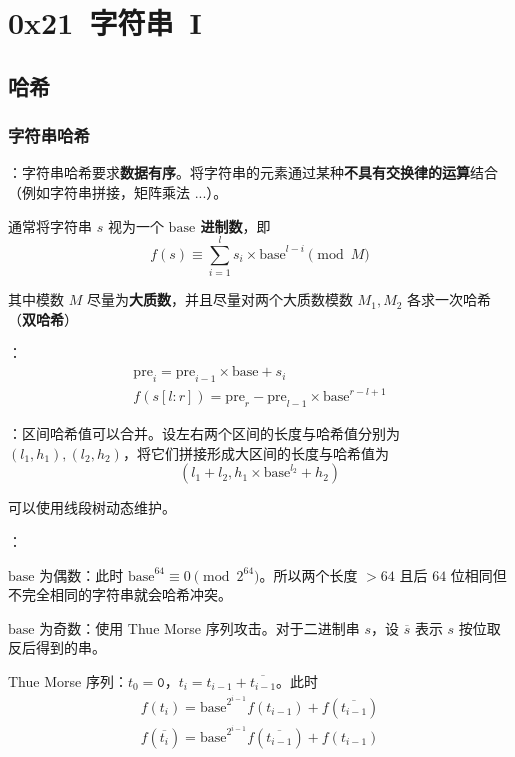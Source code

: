 \section{0x21\ 字符串\ I}
\label{sec:0x21}

\subsection{哈希}

\subsubsection{字符串哈希}

：字符串哈希要求\textbf{数据有序}。将字符串的元素通过某种\textbf{不具有交换律的运算}结合（例如字符串拼接，矩阵乘法 ...）。

通常将字符串 $s$ 视为一个 \textbf{$\mathrm{base}$ 进制数}，即
\[
f(s) \equiv \sum_{i = 1}^{l} s_i \times \mathrm{base}^{l - i} \pmod M
\]

其中模数 $M$ 尽量为\textbf{大质数}，并且尽量对两个大质数模数 $M_1, M_2$ 各求一次哈希（\textbf{双哈希}）

：
\[
\begin{gathered}
\mathrm{pre}_i = \mathrm{pre}_{i - 1} \times \mathrm{base} + s_i \\
f(s[l : r]) = \mathrm{pre}_r - \mathrm{pre}_{l - 1} \times \mathrm{base}^{r - l + 1}
\end{gathered}
\]

：区间哈希值可以合并。设左右两个区间的长度与哈希值分别为 $(l_1, h_1), (l_2, h_2)$，将它们拼接形成大区间的长度与哈希值为
\[
(l_1 + l_2, h_1 \times \mathrm{base}^{l_2} + h_2)
\]

可以使用线段树动态维护。

：

$\mathrm{base}$ 为偶数：此时 $\mathrm{base}^{64} \equiv 0 \pmod{2^{64}}$。所以两个长度 $> 64$ 且后 $64$ 位相同但不完全相同的字符串就会哈希冲突。

$\mathrm{base}$ 为奇数：使用 Thue Morse 序列攻击。对于二进制串 $s$，设 $\overline{s}$ 表示 $s$ 按位取反后得到的串。

Thue Morse 序列：$t_0 = \mathtt{0}$，$t_i = t_{i - 1} + \overline{t_{i - 1}}$。此时
\[
\begin{gathered}
f(t_i) = \mathrm{base}^{2^{i - 1}} f(t_{i - 1}) + f(\overline{t_{i - 1}}) \\
f(\overline{t_i}) = \mathrm{base}^{2^{i - 1}} f(\overline{t_{i - 1}}) + f(t_{i - 1})
\end{gathered}
\]

